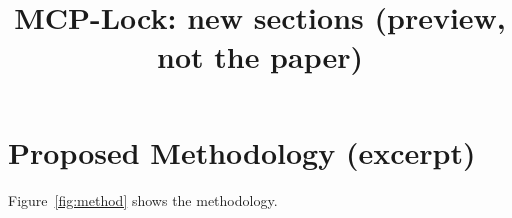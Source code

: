\documentclass[conference]{IEEEtran}
\begin{document}
\title{MCP-Lock: new sections (preview, not the paper)}
\maketitle
\setcounter{section}{1}


\section{Proposed Methodology (excerpt)}
Figure~\ref{fig:method} shows the methodology.

\setcounter{section}{7}



\end{document}

